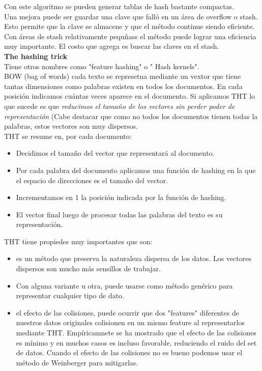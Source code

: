 \documentclass[titlepage,a4paper]{article}
\begin{document}
Con este algoritmo se pueden generar tablas de hash bastante compactas. \\

Una mejora puede ser guardar una clave que falló en un área de overflow o stash. Esto permite que la clave se almacene y que el método continue siendo eficiente. Con áreas de stash relativamente pequñass el método puede lograr una eficiencia muy importante. El costo que agrega es buscar las claves en el stash.\\

\textbf{The hashing trick} \\

Tiene otros nombres como "feature hashing" o " Hash kernels". \\

BOW (bag of words) cada texto se represetna mediante un vextor que tiene tantas dimensiones como palabras existen en todos los documentos. En cada posición indicamos cuántas veces aparece en el documento. Si aplicamos THT lo que sucede es que \textit{reducimos el tamaño de los vectores sin perder poder de representación} (Cabe destacar que como no todos los documentos tienen todas la palabras, estos vectores son muy dispersos. \\

THT se resume en, por cada documento: 
\begin{itemize}
\item Decidimos el tamaño del vector que representará al documento. 
\item Por cada palabra del documento aplicamos una función de hashing en la que el espacio de direcciones es el tamaño del vector. 
\item Incrementamos en 1 la posición indicada por la función de hashing. 
\item El vector final luego de procesar todas las palabras del texto es su representación. 
\end{itemize}

THT  tiene propiedes muy importantes que son: 
\begin{itemize}
\item es un método que preserva la naturaleza dispersa de los datos. Los vectores dispersos son mucho más sensillos de trabajar. 
\item Con alguna variante u otra, puede usarse como método genérico para representar cualquier tipo de dato. 
\item el efecto de las colisiones, puede ocurrir que dos "features" diferentes de nuestros datos originales colisionen en un mismo feature al representarlos mediante THT. Empíricamnete se ha mostrado que el efecto de las colisiones es mínimo y en muchos casos es incluso favorable, reduciendo el ruido del set de datos. Cuando el  efecto de las colisiones no es bueno podemos usar el método de Weinberger para mitigarlas. 
\end{itemize}
\end{document}
